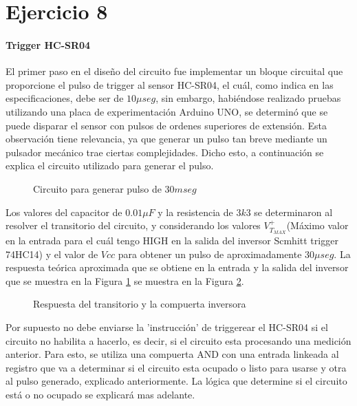 \part*{Ejercicio 8}

\subsection*{Trigger HC-SR04}

El primer paso en el diseño del circuito fue implementar un bloque circuital que proporcione el pulso de trigger al sensor HC-SR04, el cuál, como indica en las especificaciones, debe ser de $10 \mu seg$, sin embargo, habiéndose realizado pruebas utilizando una placa de experimentación Arduino UNO, se determinó que se puede disparar el sensor con pulsos de ordenes superiores de extensión. Esta observación tiene relevancia, ya que generar un pulso tan breve mediante un pulsador mecánico trae ciertas complejidades. Dicho esto, a continuación se explica el circuito utilizado para generar el pulso.
\bigskip

\begin{figure}[H]
\begin{center}

\end{center}
\caption{Circuito para generar pulso de $30 mseg$} \label{8_fig1}
\end{figure}

Los valores del capacitor de $0.01\mu F$ y la resistencia de $3k3$ se determinaron al resolver el transitorio del circuito, y considerando los valores $V_{T_{MAX}}^+$(Máximo valor en la entrada para el cuál tengo HIGH en la salida del inversor Scmhitt trigger 74HC14) y el valor de $Vcc$ para obtener un pulso de aproximadamente $30 \mu seg$. La respuesta teórica aproximada que se obtiene en la entrada y la salida del inversor que se muestra en la Figura \ref{8_fig1} se muestra en la Figura \ref{8_fig2}.

\begin{figure}[H]
\centering

\caption{Respuesta del transitorio y la compuerta inversora} 
\label{8_fig2}
\end{figure}

Por supuesto no debe enviarse la 'instrucción' de triggerear el HC-SR04 si el circuito no habilita a hacerlo, es decir, si el circuito esta procesando una medición anterior. Para esto, se utiliza una compuerta AND con una entrada linkeada al registro que va a determinar si el circuito esta ocupado o listo para usarse y otra al pulso generado, explicado anteriormente. La lógica que determine si el circuito está o no ocupado se explicará mas adelante.


